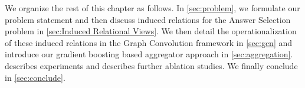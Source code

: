 We organize the rest of this chapter as follows. In \cref{sec:problem}, we formulate our problem statement and then discuss induced relations for the Answer Selection problem in \cref{sec:Induced Relational Views}. We then detail the operationalization of these induced relations in the Graph Convolution framework in \cref{sec:gcn} and introduce our gradient boosting based aggregator approach in \cref{sec:aggregation}.  describes experiments and  describes further ablation studies. We finally conclude in \cref{sec:conclude}.
